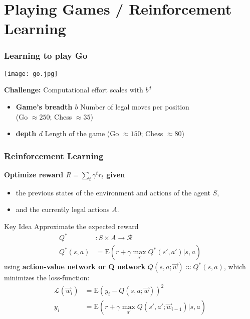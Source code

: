\section[games]{Playing Games / Reinforcement Learning}

\begin{frame}
\frametitle{Learning to play Go}
\begin{center}
\texttt{[image: go.jpg]}
\end{center}

\textbf{Challenge:} Computational effort scales with $b^d$
\begin{itemize}
\item \textbf{Game's breadth $b$} Number of legal moves per position\\ (Go $\approx 250$; Chess $\approx 35$)
\item \textbf{depth $d$} Length of the game (Go $\approx 150$; Chess $\approx 80$)
\end{itemize}
\end{frame}

\begin{frame}
\frametitle{Reinforcement Learning}

\textbf{Optimize reward $R = \sum_t \gamma^t r_t$ given}
\begin{itemize}
\item the previous states of the environment and actions of the agent $S$,
\item and the currently legal actions $A$.
\end{itemize}

\begin{exampleblock}{Key Idea}
Approximate the expected reward
\setlength{\abovedisplayskip}{0pt}
\setlength{\belowdisplayskip}{0pt}
\begin{align*}
Q^* &: S \times A \rightarrow \mathcal{R}\\
Q^*(s,a) &= \mathrm{E} \left(r + \gamma \max_{a'} Q^*(s', a') | s,a\right)
\end{align*}
using \textbf{action-value network or Q network} $Q(s,a; \vec{w}) \approx Q^*(s,a)$, which minimizes the loss-function:
\begin{align*}
\mathcal{L}(\vec{w}_i) &= \mathrm{E}\left(y_i - Q(s,a; \vec{w})\right)^2 \\
y_i &=  \mathrm{E} \left(r + \gamma \max_{a'} Q(s', a'; \vec{w}_{i-1}) | s,a\right)
\end{align*}
\end{exampleblock}

\end{frame}

